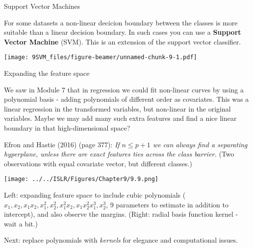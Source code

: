 \documentclass[10pt,ignorenonframetext,]{beamer}
\begin{document}
\begin{frame}{Support Vector Machines}

For some datasets a non-linear decicion boundary between the classes is
more suitable than a linear decision boundary. In such cases you can use
a \textbf{Support Vector Machine} (SVM). This is an extension of the
support vector classifier.

\texttt{[image: 9SVM\_files/figure-beamer/unnamed-chunk-9-1.pdf]}

\end{frame}

\begin{frame}

\begin{block}{Expanding the feature space}

We saw in Module 7 that in regression we could fit non-linear curves by
using a polynomial basis - adding polynomials of different order as
covariates. This was a linear regression in the transformed variables,
but non-linear in the original variables. Maybe we may add many such
extra features and find a nice linear boundary in that high-dimensional
space?

Efron and Hastie (2016) (page 377): \emph{If \(n \le p+1\) we can always
find a separating hyperplane, unless there are exact features ties
across the class barrier.} (Two observations with equal covariate
vector, but different classes.)

\end{block}

\end{frame}

\begin{frame}

\texttt{[image: ../../ISLR/Figures/Chapter9/9.9.png]}

Left: expanding feature space to include cubic polynomials
(\(x_1,x_2,x_1x_2,x_1^2,x_2^2,x_1^2x_2,x_1x_2^2x_1^3,x_2^3\), 9
parameters to estimate in addition to intercept), and also observe the
margins. (Right: radial basis function kernel - wait a bit.)

Next: replace polynomials with \emph{kernels} for elegance and
computational issues.

\end{frame}
\end{document}
